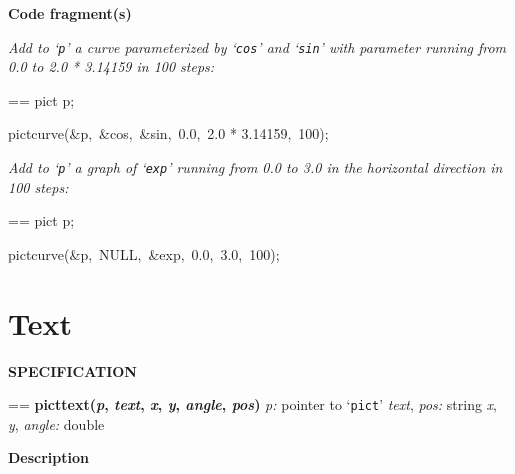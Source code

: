 \documentclass{book}
\makeatletter
\newcommand\Texinfocommandstyletextvar[1]{{\normalfont{}\textsl{#1}}}%
\newenvironment{Texinfopreformatted}{%
  \par\GNUTobeylines\obeyspaces\frenchspacing\parskip=\z@\parindent=\z@}{}
{\catcode`\^^M=13 \gdef\GNUTobeylines{\catcode`\^^M=13 \def^^M{\null\par}}}
\newenvironment{Texinfoindented}{\begin{list}{}{}\item\relax}{\end{list}}
\renewcommand{\_}{\Texinfounderscore\discretionary{}{}{}}
\makeatother
\begin{document}
\noindent{}\textbf{Code fragment(s)}

\emph{Add to `\texttt{p}' a curve parameterized by
`\texttt{cos}' and `\texttt{sin}' with parameter running from
0.0 to 2.0 * 3.14159 in 100 steps:}
\begin{Texinfoindented}
\begin{Texinfopreformatted}%
\ttfamily pict p;

pict\_curve(\&p,\ \&cos,\ \&sin,\ 0.0,\ 2.0 * 3.14159,\ 100);
\end{Texinfopreformatted}
\end{Texinfoindented}

\emph{Add to `\texttt{p}' a graph of `\texttt{exp}'
running from 0.0 to 3.0 in the horizontal direction in 100 steps:}
\begin{Texinfoindented}
\begin{Texinfopreformatted}%
\ttfamily pict p;

pict\_curve(\&p,\ NULL,\ \&exp,\ 0.0,\ 3.0,\ 100);
\end{Texinfopreformatted}
\end{Texinfoindented}

\section{{Text}}
\label{anchor:Text}%

\noindent{}\textbf{SPECIFICATION}
\begin{Texinfoindented}
\begin{Texinfopreformatted}%
\textbf{pict\_text(\Texinfocommandstyletextvar{p}, \Texinfocommandstyletextvar{text}, \Texinfocommandstyletextvar{x}, \Texinfocommandstyletextvar{y}, \Texinfocommandstyletextvar{angle}, \Texinfocommandstyletextvar{pos})}
\Texinfocommandstyletextvar{p:} pointer to `\texttt{pict}'
\Texinfocommandstyletextvar{text}, \Texinfocommandstyletextvar{pos:} string
\Texinfocommandstyletextvar{x}, \Texinfocommandstyletextvar{y}, \Texinfocommandstyletextvar{angle:} double
\end{Texinfopreformatted}
\end{Texinfoindented}
%
%
%

\noindent{}\textbf{Description}
\end{document}
